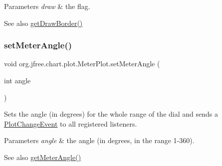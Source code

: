 \begin{DoxyParams}{Parameters}
{\em draw} & the flag.\\
\hline
\end{DoxyParams}
\begin{DoxySeeAlso}{See also}
\mbox{\hyperlink{classorg_1_1jfree_1_1chart_1_1plot_1_1_meter_plot_a0f107cfb9d7a9829dd8214c324bc2ea5}{get\+Draw\+Border()}} 
\end{DoxySeeAlso}
\mbox{\label{classorg_1_1jfree_1_1chart_1_1plot_1_1_meter_plot_aef7b760aa154ce1bf12b51bc4d693f91}} 
\subsubsection{\texorpdfstring{set\+Meter\+Angle()}{setMeterAngle()}}
{\footnotesize\ttfamily void org.\+jfree.\+chart.\+plot.\+Meter\+Plot.\+set\+Meter\+Angle (\begin{DoxyParamCaption}\item[{int}]{angle }\end{DoxyParamCaption})}

Sets the angle (in degrees) for the whole range of the dial and sends a \mbox{\hyperlink{}{Plot\+Change\+Event}} to all registered listeners.


\begin{DoxyParams}{Parameters}
{\em angle} & the angle (in degrees, in the range 1-\/360).\\
\hline
\end{DoxyParams}
\begin{DoxySeeAlso}{See also}
\mbox{\hyperlink{classorg_1_1jfree_1_1chart_1_1plot_1_1_meter_plot_a6b166a09f3cb56d314a7d0b6c6aa93db}{get\+Meter\+Angle()}} 
\end{DoxySeeAlso}
\mbox{\label{classorg_1_1jfree_1_1chart_1_1plot_1_1_meter_plot_a3fe63e901f282c3ea499d816c612e9a9}} 

